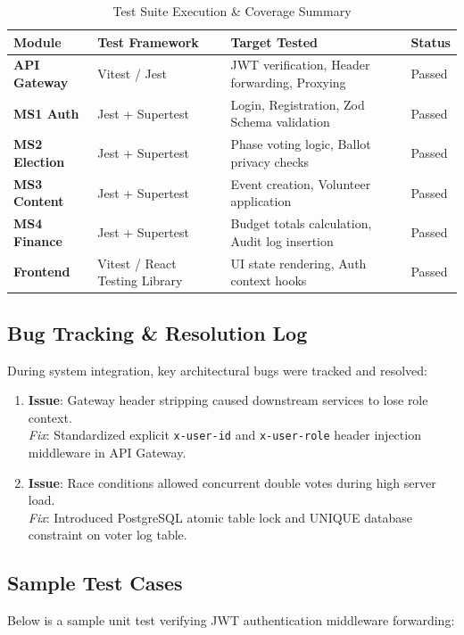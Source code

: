 \documentclass[12pt, a4paper]{article}
\begin{document}
\begin{table}[h!]
\centering
\caption{Test Suite Execution \& Coverage Summary}
\renewcommand{\arraystretch}{1.3}
\begin{tabular}{@{}llll@{}}
\toprule
\textbf{Module} & \textbf{Test Framework} & \textbf{Target Tested} & \textbf{Status} \\ \midrule
\textbf{API Gateway} & Vitest / Jest & JWT verification, Header forwarding, Proxying & Passed \\
\textbf{MS1 Auth} & Jest + Supertest & Login, Registration, Zod Schema validation & Passed \\
\textbf{MS2 Election} & Jest + Supertest & Phase voting logic, Ballot privacy checks & Passed \\
\textbf{MS3 Content} & Jest + Supertest & Event creation, Volunteer application & Passed \\
\textbf{MS4 Finance} & Jest + Supertest & Budget totals calculation, Audit log insertion & Passed \\
\textbf{Frontend} & Vitest / React Testing Library & UI state rendering, Auth context hooks & Passed \\ \bottomrule
\end{tabular}
\end{table}

\subsection{Bug Tracking \& Resolution Log}
During system integration, key architectural bugs were tracked and resolved:
\begin{enumerate}
    \item \textbf{Issue}: Gateway header stripping caused downstream services to lose role context.\\
    \textit{Fix}: Standardized explicit \texttt{x-user-id} and \texttt{x-user-role} header injection middleware in API Gateway.
    \item \textbf{Issue}: Race conditions allowed concurrent double votes during high server load.\\
    \textit{Fix}: Introduced PostgreSQL atomic table lock and UNIQUE database constraint on voter log table.
\end{enumerate}

\subsection{Sample Test Cases}
Below is a sample unit test verifying JWT authentication middleware forwarding:
\end{document}
